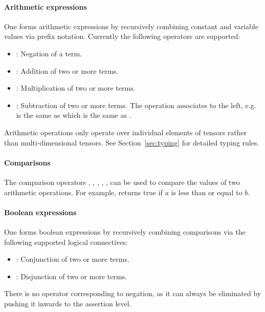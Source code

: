 \paragraph{Arithmetic expressions}

One forms arithmetic expressions by recursively combining constant and variable values via prefix notation. Currently the following operators are supported:
\begin{itemize}
	\item {}: Negation of a term.
    \item {}: Addition of two or more terms. 
    \item {}: Multiplication of two or more terms. 
    \item {}: Subtraction of two or more terms. The operation associates to the left, e.g.  is the same as  which is the same as .
\end{itemize}
Arithmetic operations only operate over individual elements of tensors rather than multi-dimensional tensors. See Section~\ref{sec:typing} for detailed typing rules.

\paragraph{Comparisons}

The comparison operators \inlinevnn{<=}, \inlinevnn{>=}, \inlinevnn{<}, \inlinevnn{>}, \inlinevnn{=}, \inlinevnn{!=} can be used to compare the values of two arithmetic operations.
For example,  returns true if $a$ is less than or equal to $b$.
    
\paragraph{Boolean expressions} 

One forms boolean expressions by recursively combining comparisons via the following supported logical connectives:
\begin{itemize}
    \item {}: Conjunction of two or more terms.
    \item {}: Disjunction of two or more terms.
\end{itemize}
There is no operator corresponding to negation, as it can always be eliminated by pushing it inwards to the assertion level.

